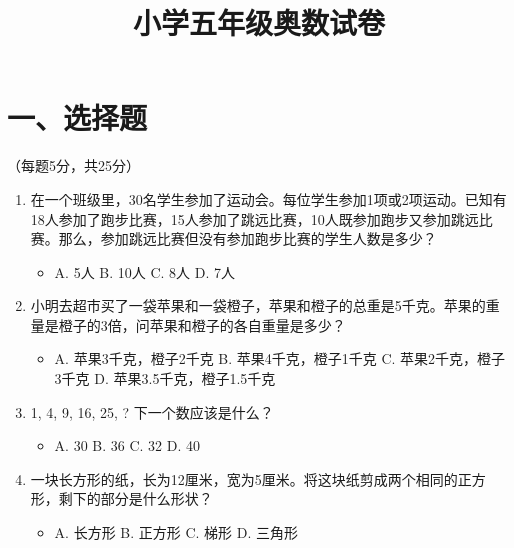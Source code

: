 \documentclass{article}
\title{小学五年级奥数试卷}
\author{}
\date{}
\begin{document}
\maketitle

\section*{一、选择题}（每题5分，共25分）

\begin{enumerate}
    \item 在一个班级里，30名学生参加了运动会。每位学生参加1项或2项运动。已知有18人参加了跑步比赛，15人参加了跳远比赛，10人既参加跑步又参加跳远比赛。那么，参加跳远比赛但没有参加跑步比赛的学生人数是多少？
    \begin{itemize}
        \item A. 5人 \hspace{1cm} B. 10人 \hspace{1cm} C. 8人 \hspace{1cm} D. 7人
    \end{itemize}
    
    \item 小明去超市买了一袋苹果和一袋橙子，苹果和橙子的总重是5千克。苹果的重量是橙子的3倍，问苹果和橙子的各自重量是多少？
    \begin{itemize}
        \item A. 苹果3千克，橙子2千克 \hspace{1cm} B. 苹果4千克，橙子1千克 \hspace{1cm} C. 苹果2千克，橙子3千克 \hspace{1cm} D. 苹果3.5千克，橙子1.5千克
    \end{itemize}
    
    \item 1, 4, 9, 16, 25, ? 下一个数应该是什么？
    \begin{itemize}
        \item A. 30 \hspace{1cm} B. 36 \hspace{1cm} C. 32 \hspace{1cm} D. 40
    \end{itemize}
    
    \item 一块长方形的纸，长为12厘米，宽为5厘米。将这块纸剪成两个相同的正方形，剩下的部分是什么形状？
    \begin{itemize}
        \item A. 长方形 \hspace{1cm} B. 正方形 \hspace{1cm} C. 梯形 \hspace{1cm} D. 三角形
    \end{itemize}
    

\end{enumerate}
\end{document}
